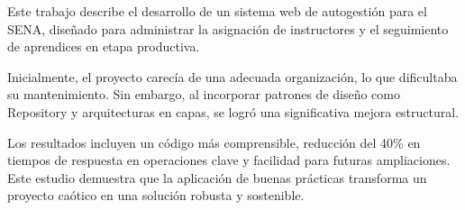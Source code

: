 Este trabajo describe el desarrollo de un sistema web de autogestión para el SENA, diseñado para administrar la asignación de instructores y el seguimiento de aprendices en etapa productiva.

Inicialmente, el proyecto carecía de una adecuada organización, lo que dificultaba su mantenimiento. Sin embargo, al incorporar patrones de diseño como Repository y arquitecturas en capas, se logró una significativa mejora estructural.

Los resultados incluyen un código más comprensible, reducción del 40\% en tiempos de respuesta en operaciones clave y facilidad para futuras ampliaciones. Este estudio demuestra que la aplicación de buenas prácticas transforma un proyecto caótico en una solución robusta y sostenible.